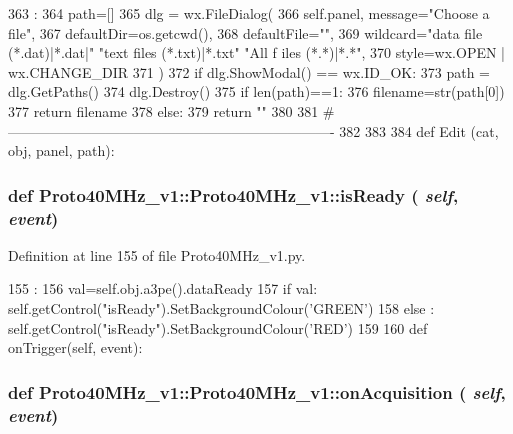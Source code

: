 \begin{DoxyCode}
363                      :
364         path=[]
365         dlg = wx.FileDialog(
366             self.panel, message="Choose a file",
367             defaultDir=os.getcwd(), 
368             defaultFile="",
369             wildcard="data file (*.dat)|*.dat|" "text files (*.txt)|*.txt" "All f
      iles (*.*)|*.*",
370             style=wx.OPEN | wx.CHANGE_DIR
371             )
372         if dlg.ShowModal() == wx.ID_OK:
373             path = dlg.GetPaths()
374         dlg.Destroy()
375         if len(path)==1:
376             filename=str(path[0])
377             return filename
378         else:   
379             return ""
380          
381 #----------------------------------------------------------------------
382 
383 
384 
def Edit (cat, obj, panel, path):
\end{DoxyCode}
\hypertarget{classProto40MHz__v1_1_1Proto40MHz__v1_ad828595957c65e5771f01691411b5452}{
\subsubsection[{isReady}]{\setlength{\rightskip}{0pt plus 5cm}def Proto40MHz\_\-v1::Proto40MHz\_\-v1::isReady ( {\em self}, \/   {\em event})}}
\label{classProto40MHz__v1_1_1Proto40MHz__v1_ad828595957c65e5771f01691411b5452}


Definition at line 155 of file Proto40MHz\_\-v1.py.


\begin{DoxyCode}
155                             :
156         val=self.obj.a3pe().dataReady
157         if val: self.getControl("isReady").SetBackgroundColour('GREEN')
158         else : self.getControl("isReady").SetBackgroundColour('RED')
159   
160             
    def onTrigger(self, event):
\end{DoxyCode}
\hypertarget{classProto40MHz__v1_1_1Proto40MHz__v1_a0ca413d70eb9ded8b86ca04e71eaccc4}{
\subsubsection[{onAcquisition}]{\setlength{\rightskip}{0pt plus 5cm}def Proto40MHz\_\-v1::Proto40MHz\_\-v1::onAcquisition ( {\em self}, \/   {\em event})}}
\label{classProto40MHz__v1_1_1Proto40MHz__v1_a0ca413d70eb9ded8b86ca04e71eaccc4}


